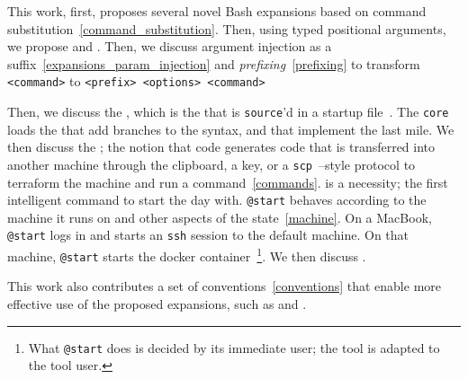 This work, first, proposes several novel Bash expansions based on command substitution~\ref{command_substitution}. Then, using typed positional arguments, we propose  and . Then, we discuss argument injection as a suffix~\ref{expansions_param_injection} and \emph{prefixing}~\ref{prefixing} to transform \texttt{<command>} to \texttt{<prefix> <options> <command>}

Then, we discuss the , which is the  that is \texttt{source}'d in a startup file~. The \texttt{core} loads the  that add branches to the syntax, and  that implement the last mile. We then discuss the ; the notion that code generates code that is transferred into another machine through the clipboard, a key, or a \texttt{scp}~--style protocol to terraform the machine and run a command~\ref{commands}.  is a necessity; the first intelligent command to start the day with. \texttt{@start} behaves according to the machine it runs on and other aspects of the state~\ref{machine}. On a MacBook, \texttt{@start} logs in and starts an \texttt{ssh} session to the default machine. On that machine, \texttt{@start} starts the docker container~\footnote{What \texttt{@start} does is decided by its immediate user; the tool is adapted to the tool user.}. We then discuss .

This work also contributes a set of conventions~\ref{conventions} that enable more effective use of the proposed expansions, such as and .
